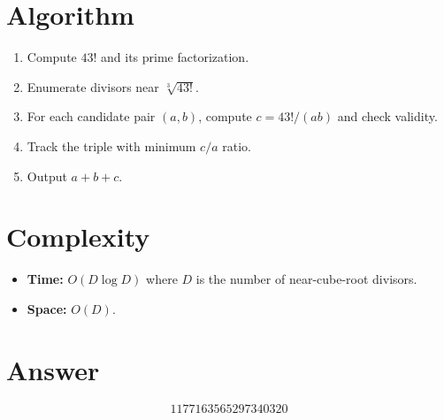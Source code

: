 \documentclass[12pt]{article}
\begin{document}
\section{Algorithm}
\begin{enumerate}
    \item Compute $43!$ and its prime factorization.
    \item Enumerate divisors near $\sqrt[3]{43!}$.
    \item For each candidate pair $(a, b)$, compute $c = 43!/(ab)$ and check validity.
    \item Track the triple with minimum $c/a$ ratio.
    \item Output $a + b + c$.
\end{enumerate}

\section{Complexity}
\begin{itemize}
    \item \textbf{Time:} $O(D \log D)$ where $D$ is the number of near-cube-root divisors.
    \item \textbf{Space:} $O(D)$.
\end{itemize}

\section{Answer}

\[
\boxed{1177163565297340320}
\]
\end{document}
